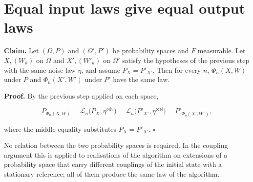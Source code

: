 \documentclass[11pt,a4paper]{article}
\begin{document}
\section{\texorpdfstring{Equal input laws give equal output laws}{Equal input laws give equal output laws}}


\textbf{Claim.} Let \((\Omega,P)\) and \((\Omega',P')\) be probability spaces and \(F\) measurable. Let \(X,(W_k)\) on \(\Omega\) and \(X',(W'_k)\) on \(\Omega'\) satisfy the hypotheses of the previous step with the same noise law \(\eta\), and assume \(P_X=P'_{X'}\). Then for every \(n\), \(\Phi_n(X,W)\) under \(P\) and \(\Phi_n(X',W')\) under \(P'\) have the same law.




\textbf{Proof.} By the previous step applied on each space,


\[P_{\Phi_n(X,W)}=\mathcal L_n\bigl(P_X,\eta^{\otimes\mathbb N}\bigr)=\mathcal L_n\bigl(P'_{X'},\eta^{\otimes\mathbb N}\bigr)=P'_{\Phi_n(X',W')},\]


where the middle equality substitutes \(P_X=P'_{X'}\). \(\square\)




No relation between the two probability spaces is required. In the coupling argument this is applied to realisations of the algorithm on extensions of a probability space that carry different couplings of the initial state with a stationary reference; all of them produce the same law of the algorithm.
\end{document}
